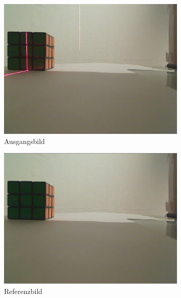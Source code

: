 \documentclass[ngerman,a4paper,parskip=half]{scrartcl}
\begin{document}
\begin{figure}
	\centering

	\begin{subfigure}{0.23\textwidth}
		\includegraphics[width=\textwidth]{includes/line_line.png}
		\caption{Ausgangsbild}
	\end{subfigure}
	\hfill
	\begin{subfigure}{0.23\textwidth}
		\includegraphics[width=\textwidth]{includes/line_ref.png}
		\caption{Referenzbild}
	\end{subfigure}
	\hfill
	\begin{subfigure}{0.23\textwidth}

\end{subfigure}
\end{figure}
\end{document}
